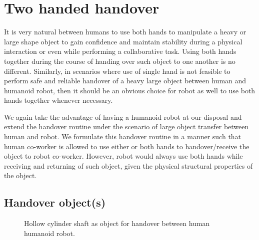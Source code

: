 


\section{Two handed handover}\label{both hands together}

It is very natural between humans to use both hands to manipulate a heavy or large shape object to gain confidence and maintain stability during a physical interaction or even while performing a collaborative task. Using both hands together during the course of handing over such object to one another is no different. Similarly, in scenarios where use of single hand is not feasible to perform safe and reliable handover of a heavy large object between human and humanoid robot, then it should be an obvious choice for robot as well to use both hands together whenever necessary. 


We again take the advantage of having a humanoid robot at our disposal and extend the handover routine under the scenario of large object transfer between human and robot. We formulate this handover routine in a manner such that human co-worker is allowed to use either or both hands to handover/receive the object to robot co-worker. However, robot would always use both hands while receiving and returning of such object, given the physical structural properties of the object.

\subsection{Handover object(s)}


\begin{figure}[hpt]
	\caption{Hollow cylinder shaft as object for handover between human humanoid robot.}
	\label{fig:pipe_ex}
\end{figure}


